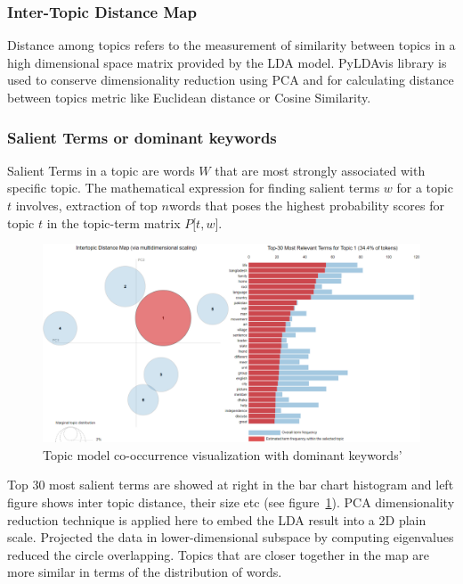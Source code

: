 \documentclass[sn-mathphys,Numbered]{sn-jnl}%
\theoremstyle{thmstyleone}%
\theoremstyle{thmstyletwo}%
\theoremstyle{thmstylethree}%
\begin{document}
\subsubsection{Inter-Topic Distance Map}

Distance among topics refers to the measurement of similarity between
topics in a high dimensional space matrix provided by the LDA model.
PyLDAvis library is used to conserve dimensionality reduction using PCA
and for calculating distance between topics metric like Euclidean
distance or Cosine Similarity.

\subsubsection{Salient Terms or dominant keywords}

Salient Terms in a topic are words \(W\) that are most strongly
associated with specific topic. The mathematical expression for finding
salient terms \(w\) for a topic \(t\) involves, extraction of top
\(n\)words that poses the highest probability scores for topic \(t\) in
the topic-term matrix \(P\lbrack t,w\rbrack\).

\begin{figure}[h]
\centerline{\includegraphics[width=\textwidth]{pyldvis.png}}
\caption{Topic model co-occurrence visualization with dominant keywords'}
\label{Relative_weight_pyldvis}
\end{figure}

Top 30 most salient terms are showed at right in the bar chart histogram
and left figure shows inter topic distance, their size etc (see figure~\ref{Relative_weight_pyldvis}). PCA
dimensionality reduction technique is applied here to embed the LDA
result into a 2D plain scale. Projected the data in lower-dimensional
subspace by computing eigenvalues reduced the circle overlapping. Topics
that are closer together in the map are more similar in terms of the
distribution of words.
\end{document}
